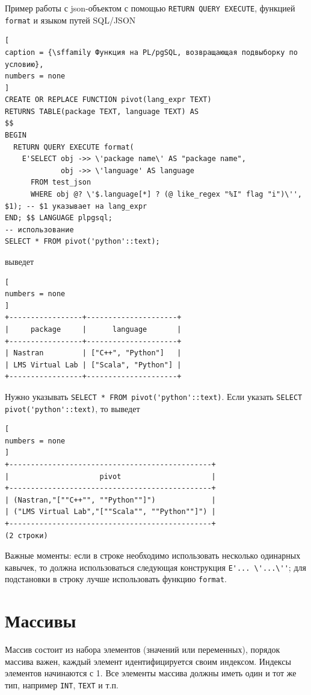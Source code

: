 \documentclass[%
	11pt,
	a4paper,
	utf8,
		]{article}
\begin{document}
Пример работы с json-объектом с помощью \texttt{\color{blue}RETURN QUERY EXECUTE}, функцией \texttt{format} и языком путей SQL/JSON
\begin{lstlisting}[
caption = {\sffamily Функция на PL/pgSQL, возвращающая подвыборку по условию},
numbers = none
]
CREATE OR REPLACE FUNCTION pivot(lang_expr TEXT)
RETURNS TABLE(package TEXT, language TEXT) AS
$$
BEGIN
  RETURN QUERY EXECUTE format(
    E'SELECT obj ->> \'package name\' AS "package name",
             obj ->> \'language' AS language
      FROM test_json
      WHERE obj @? \'$.language[*] ? (@ like_regex "%I" flag "i")\'', $1); -- $1 указывает на lang_expr
END; $$ LANGUAGE plpgsql;
-- использование
SELECT * FROM pivot('python'::text);
\end{lstlisting}
выведет
\begin{lstlisting}[
numbers = none
]
+-----------------+---------------------+
|     package     |      language       |
+-----------------+---------------------+
| Nastran         | ["C++", "Python"]   |
| LMS Virtual Lab | ["Scala", "Python"] |
+-----------------+---------------------+
\end{lstlisting}
Нужно указывать \lstinline{SELECT * FROM pivot('python'::text)}. Если указать \lstinline{SELECT pivot('python'::text)}, то выведет
\begin{lstlisting}[
numbers = none
]
+-----------------------------------------------+
|                     pivot                     |
+-----------------------------------------------+
| (Nastran,"[""C++"", ""Python""]")             |
| ("LMS Virtual Lab","[""Scala"", ""Python""]") |
+-----------------------------------------------+
(2 строки)
\end{lstlisting}

Важные моменты: если в строке необходимо использовать несколько одинарных кавычек, то должна использоваться следующая конструкция {\color{blue}\lstinline{E'... \'...\''}}; для подстановки в строку лучше использовать функцию \texttt{format}.

\section{Массивы}

Массив состоит из набора элементов (значений или переменных), порядок массива важен, каждый элемент идентифицируется своим индексом. Индексы элементов начинаются с 1. Все элементы массива должны иметь один и тот же тип, например \texttt{INT}, \texttt{TEXT} и т.п.
\end{document}
